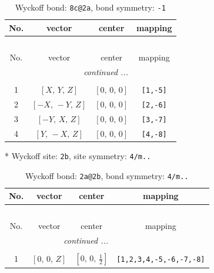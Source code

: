 \documentclass[fleqn,8pt]{jsarticle}
\begin{document}
\renewcommand{\arraystretch}{1.2}
\begin{longtable}{cccc}
\caption{Wyckoff bond: {\tt 8c@2a}, bond symmetry: {\tt -1}}
 \\
 \hline \hline
No. & vector & center & mapping \\ \hline \endfirsthead

\multicolumn{3}{l}{\tablename\ \thetable{}} \\
 \hline \hline
No. & vector & center & mapping \\ \hline \endhead

 \hline \hline
\multicolumn{3}{r}{\footnotesize\it continued ...} \\ \endfoot

 \hline \hline
\multicolumn{3}{r}{} \\ \endlastfoot

1 & $\left[ X,\, Y,\, Z \right]$ & $\left[ 0,\, 0,\, 0 \right]$ & {\tt [1,-5]} \\ \hline
2 & $\left[ - X,\, - Y,\, Z \right]$ & $\left[ 0,\, 0,\, 0 \right]$ & {\tt [2,-6]} \\ \hline
3 & $\left[ - Y,\, X,\, Z \right]$ & $\left[ 0,\, 0,\, 0 \right]$ & {\tt [3,-7]} \\ \hline
4 & $\left[ Y,\, - X,\, Z \right]$ & $\left[ 0,\, 0,\, 0 \right]$ & {\tt [4,-8]} \\
\end{longtable}
* Wyckoff site: {\tt 2b}, site symmetry: {\tt 4/m..}
\renewcommand{\arraystretch}{1.2}
\begin{longtable}{cccc}
\caption{Wyckoff bond: {\tt 2a@2b}, bond symmetry: {\tt 4/m..}}
 \\
 \hline \hline
No. & vector & center & mapping \\ \hline \endfirsthead

\multicolumn{3}{l}{\tablename\ \thetable{}} \\
 \hline \hline
No. & vector & center & mapping \\ \hline \endhead

 \hline \hline
\multicolumn{3}{r}{\footnotesize\it continued ...} \\ \endfoot

 \hline \hline
\multicolumn{3}{r}{} \\ \endlastfoot

1 & $\left[ 0,\, 0,\, Z \right]$ & $\left[ 0,\, 0,\, \frac{1}{2} \right]$ & {\tt [1,2,3,4,-5,-6,-7,-8]} \\
\end{longtable}
\renewcommand{\arraystretch}{1.2}
\end{document}
